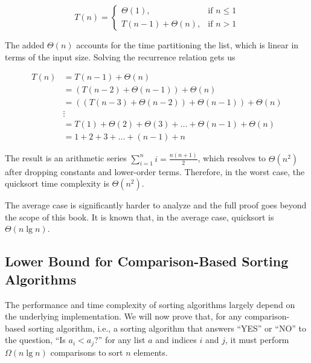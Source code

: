 \[
T(n)=
  \begin{cases}
    \Theta(1), & \text{if } n \leq 1\\
    T(n - 1) + \Theta(n), & \text{if } n > 1
  \end{cases}
\]

The added $\Theta(n)$ accounts for the time partitioning the list, which is linear in terms of the input size. Solving the recurrence relation gets us

\begin{align*}
T(n) &= T(n - 1) + \Theta(n)\\
     &= (T(n - 2) + \Theta(n - 1)) + \Theta(n)\\
     &= ((T(n - 3) + \Theta(n - 2)) + \Theta(n - 1)) + \Theta(n)\\
     &\vdots\\
     &= T(1) + \Theta(2) + \Theta(3) + ... + \Theta(n - 1) + \Theta(n)\\
     &= 1 + 2 + 3 + ... + (n - 1) + n
\end{align*}

The result is an arithmetic series $\sum_{i=1}^{n}{i}=\frac{n(n+1)}{2}$, which resolves to $\Theta(n^2)$ after dropping constants and lower-order terms. Therefore, in the worst case, the quicksort time complexity is $\Theta(n^2)$.

The average case is significantly harder to analyze and the full proof goes beyond the scope of this book. It is known that, in the average case, quicksort is $\Theta(n\lg{n})$. 

\subsection{Lower Bound for Comparison-Based Sorting Algorithms}
The performance and time complexity of sorting algorithms largely depend on the underlying implementation. We will now prove that, for any comparison-based sorting algorithm, i.e., a sorting algorithm that answers ``YES'' or ``NO'' to the question, ``Is $a_i < a_j$?'' for any list $a$ and indices $i$ and $j$, it must perform $\Omega(n \lg n)$ comparisons to sort $n$ elements.

